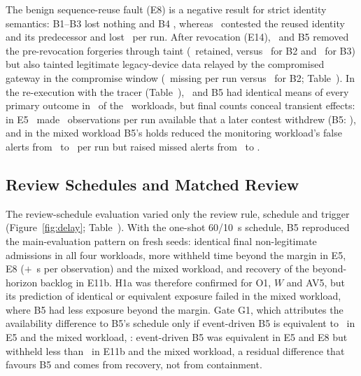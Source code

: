 The benign sequence-reuse fault (E8) is a negative result for strict identity semantics: B1--B3 lost nothing and B4 \RSZeroEightBFourlegitmissing, whereas \sys\ contested the reused identity and its predecessor and lost \RSZeroEightPBTIlegitmissing\ per run. After revocation (E14), \sys\ and B5 removed the pre-revocation forgeries through taint (\RRevPBTIZerosnonlegit\ retained, versus \RRevBTwoZerosnonlegit\ for B2 and \RRevBThreeZerosnonlegit\ for B3) but also tainted legitimate legacy-device data relayed by the compromised gateway in the compromise window (\RRevPBTIZerosmissing\ missing per run versus \RRevBTwoZerosmissing\ for B2; Table~). In the re-execution with the tracer (Table~), \sys\ and B5 had identical means of every primary outcome in \WAzeroSameBfiveN\ of the \WAzeroScenN\ workloads, but final counts conceal transient effects: in E5 \sys\ made \WAzeroEfivePWDR\ observations per run available that a later contest withdrew (B5: \WAzeroEfiveBfiveWDR), and in the mixed workload B5's holds reduced the monitoring workload's false alerts from \WAzeroMixedPALF\ to \WAzeroMixedBfiveALF\ per run but raised missed alerts from \WAzeroMixedPALM\ to \WAzeroMixedBfiveALM.

\subsection{Review Schedules and Matched Review}\label{sec:res-review}

The review-schedule evaluation varied only the review rule, schedule and trigger (Figure~\ref{fig:delay}; Table~). With the one-shot 60/10~s schedule, B5 reproduced the main-evaluation pattern on fresh seeds: identical final non-legitimate admissions in all four workloads, more withheld time beyond the margin in E5, E8 ($+$\WAoneEeightBFivehistvsPBTIWd~s per observation) and the mixed workload, and recovery of the beyond-horizon backlog in E11b. H1a was therefore confirmed for O1, $W$ and AV5, but its prediction of identical or equivalent exposure failed in the mixed workload, where B5 had less exposure beyond the margin. Gate G1, which attributes the availability difference to B5's schedule only if event-driven B5 is equivalent to \sys\ in E5 and the mixed workload, \WAoneGOne: event-driven B5 was equivalent in E5 and E8 but withheld less than \sys\ in E11b and the mixed workload, a residual difference that favours B5 and comes from recovery, not from containment.

